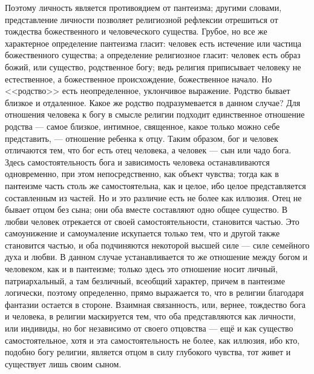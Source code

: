 \documentclass[12pt,oneside]{book}
\begin{document}
Поэтому личность является противоядием от пантеизма; другими словами, представление личности позволяет религиозной рефлексии отрешиться от тождества божественного и человеческого существа. Грубое, но все же характерное определение пантеизма гласит: человек есть истечение или частица божественного существа; а определение религиозное гласит: человек есть образ божий, или существо, родственное богу; ведь религия приписывает человеку не естественное, а божественное происхождение, божественное начало. Но <<родство>> есть неопределенное, уклончивое выражение. Родство бывает близкое и отдаленное. Какое же родство подразумевается в данном случае? Для отношения человека к богу в смысле религии подходит единственное отношение родства --- самое близкое, интимное, священное, какое только можно себе представить, --- отношение ребенка к отцу. Таким образом, бог и человек отличаются тем, что бог есть отец человека, а человек --- сын или чадо бога. Здесь самостоятельность бога и зависимость человека останавливаются одновременно, при этом непосредственно, как объект чувства; тогда как в пантеизме часть столь же самостоятельна, как и целое, ибо целое представляется составленным из частей. Но и это различие есть не более как иллюзия. Отец не бывает отцом без сына; они оба вместе составляют одно общее существо. В любви человек отрекается от своей самостоятельности, становится частью. Это самоунижение и самоумаление искупается только тем, что и другой также становится частью, и оба подчиняются некоторой высшей силе --- силе семейного духа и любви. В данном случае устанавливается то же отношение между богом и человеком, как и в пантеизме; только здесь это отношение носит личный, патриархальный, а там безличный, всеобщий характер, причем в пантеизме логически, поэтому определенно, прямо выражается то, что в религии благодаря фантазии остается в стороне. Взаимная связанность, или, вернее, тождество бога и человека, в религии маскируется тем, что оба представляются как личности, или индивиды, но бог независимо от своего отцовства --- ещё и как существо самостоятельное, хотя и эта самостоятельность не более, как иллюзия, ибо кто, подобно богу религии, является отцом в силу глубокого чувства, тот живет и существует лишь своим сыном.
\end{document}
